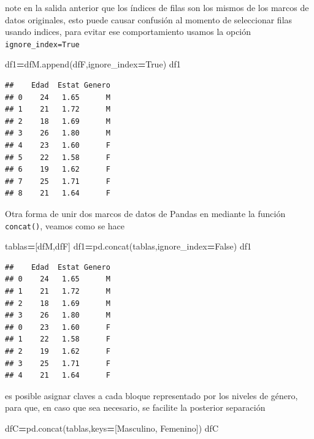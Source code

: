 \documentclass[
]{book}
\newenvironment{Shaded}{\begin{snugshade}}{\end{snugshade}}
\newcommand{\NormalTok}[1]{#1}
\newcommand{\OperatorTok}[1]{\textcolor[rgb]{0.81,0.36,0.00}{\textbf{#1}}}
\newcommand{\StringTok}[1]{\textcolor[rgb]{0.31,0.60,0.02}{#1}}
\newcommand{\VariableTok}[1]{\textcolor[rgb]{0.00,0.00,0.00}{#1}}
\theoremstyle{definition}
\theoremstyle{definition}
\theoremstyle{definition}
\theoremstyle{definition}
\theoremstyle{remark}
\begin{document}
note en la salida anterior que los índices de filas son los mismos de los marcos de datos originales, esto puede causar confusión al momento de seleccionar filas usando indices, para evitar ese comportamiento usamos la opción \texttt{ignore\_index=True}

\begin{Shaded}
\begin{Highlighting}[]
\NormalTok{df1}\OperatorTok{=}\NormalTok{dfM.append(dfF,ignore\_index}\OperatorTok{=}\VariableTok{True}\NormalTok{)}
\NormalTok{df1 }
\end{Highlighting}
\end{Shaded}

\begin{verbatim}
##    Edad  Estat Genero
## 0    24   1.65      M
## 1    21   1.72      M
## 2    18   1.69      M
## 3    26   1.80      M
## 4    23   1.60      F
## 5    22   1.58      F
## 6    19   1.62      F
## 7    25   1.71      F
## 8    21   1.64      F
\end{verbatim}

Otra forma de unir dos marcos de datos de Pandas en mediante la función \texttt{concat()}, veamos como se hace

\begin{Shaded}
\begin{Highlighting}[]
\NormalTok{tablas}\OperatorTok{=}\NormalTok{[dfM,dfF] }
\NormalTok{df1}\OperatorTok{=}\NormalTok{pd.concat(tablas,ignore\_index}\OperatorTok{=}\VariableTok{False}\NormalTok{) }
\NormalTok{df1}
\end{Highlighting}
\end{Shaded}

\begin{verbatim}
##    Edad  Estat Genero
## 0    24   1.65      M
## 1    21   1.72      M
## 2    18   1.69      M
## 3    26   1.80      M
## 0    23   1.60      F
## 1    22   1.58      F
## 2    19   1.62      F
## 3    25   1.71      F
## 4    21   1.64      F
\end{verbatim}

es posible asignar claves a cada bloque representado por los niveles de género, para que, en caso que sea necesario, se facilite la posterior separación

\begin{Shaded}
\begin{Highlighting}[]
\NormalTok{dfC}\OperatorTok{=}\NormalTok{pd.concat(tablas,keys}\OperatorTok{=}\NormalTok{[}\StringTok{\textquotesingle{}Masculino\textquotesingle{}}\NormalTok{, }\StringTok{\textquotesingle{}Femenino\textquotesingle{}}\NormalTok{]) }
\NormalTok{dfC}
\end{Highlighting}
\end{Shaded}
\end{document}
